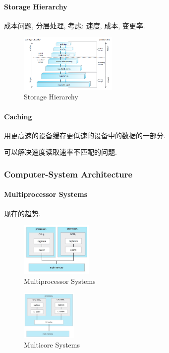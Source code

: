 \paragraph{Storage Hierarchy} 成本问题, 分层处理, 考虑: 速度, 成本, 变更率. 

\begin{figure}[!htb]
    \centering
    \includegraphics[width=0.42\textwidth]{pic/OS1/storage.png}
    \caption{Storage Hierarchy}
\end{figure}

\paragraph{Caching} 用更高速的设备缓存更低速的设备中的数据的一部分. 

可以解决速度读取速率不匹配的问题. 

\subsubsection{Computer-System Architecture}

\paragraph{Multiprocessor Systems}现在的趋势. 

\begin{figure}[!htb]
    \centering
    \includegraphics[width=0.309\textwidth]{pic/OS1/Multiprocessor Systems}
    \caption{Multiprocessor Systems}
\end{figure}

\begin{figure}[!htb]
    \centering
    \includegraphics[width=0.24\textwidth]{pic/OS1/Multicore Systems}
    \caption{Multicore Systems}
\end{figure}

